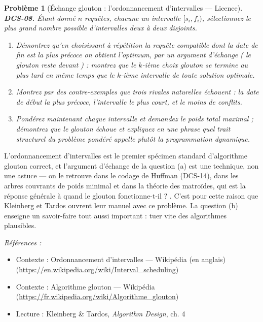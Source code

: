 \documentclass[11pt]{article}
\newtheorem{problem}{Problème}
\newenvironment{refs}{\par\small\noindent\emph{Références :}\begin{itemize}\setlength\itemsep{0pt}}{\end{itemize}\normalsize}
\begin{document}
\bigskip

\begin{problem}[{Échange glouton : l'ordonnancement d'intervalles --- Licence}]
\textbf{DCS-08.} Étant donné $n$ requêtes, chacune un intervalle $[s_i, f_i)$, sélectionnez le plus grand nombre possible d'intervalles deux à deux disjoints.
\begin{enumerate}
\item[(a)] Démontrez qu'en choisissant à répétition la requête compatible dont la \textit{date de fin est la plus précoce} on obtient l'optimum, par un argument d'échange (\og{} le glouton reste devant \fg{}) : montrez que le $k$-ième choix glouton se termine au plus tard en même temps que le $k$-ième intervalle de toute solution optimale.
\item[(b)] Montrez par des contre-exemples que trois rivales naturelles échouent : la date de début la plus précoce, l'intervalle le plus court, et le moins de conflits.
\item[(c)] Pondérez maintenant chaque intervalle et demandez le poids total maximal ; démontrez que le glouton échoue et expliquez en une phrase quel trait structurel du problème pondéré appelle plutôt la programmation dynamique.
\end{enumerate}

\end{problem}

\noindent L'ordonnancement d'intervalles est le premier spécimen standard d'algorithme glouton correct, et l'argument d'échange de la question (a) est une technique, non une astuce --- on le retrouve dans le codage de Huffman (DCS-14), dans les arbres couvrants de poids minimal et dans la théorie des matroïdes, qui est la réponse générale à \og{} quand le glouton fonctionne-t-il ? \fg{}. C'est pour cette raison que Kleinberg et Tardos ouvrent leur manuel avec ce problème. La question (b) enseigne un savoir-faire tout aussi important : tuer vite des algorithmes plausibles.

\begin{refs}
\item Contexte : Ordonnancement d'intervalles --- Wikipédia (en anglais) (\url{https://en.wikipedia.org/wiki/Interval_scheduling})
\item Contexte : Algorithme glouton --- Wikipédia (\url{https://fr.wikipedia.org/wiki/Algorithme_glouton})
\item Lecture : Kleinberg \& Tardos, \textit{Algorithm Design}, ch. 4
\end{refs}
\end{document}
